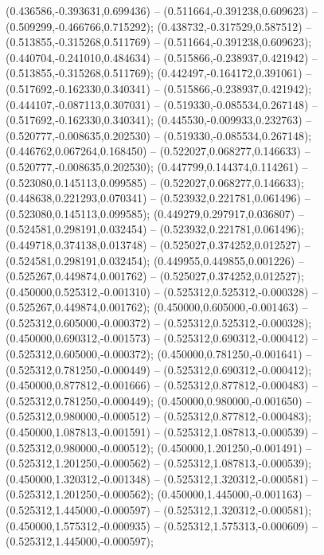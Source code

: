  (0.436586,-0.393631,0.699436) -- (0.511664,-0.391238,0.609623) -- (0.509299,-0.466766,0.715292);
 (0.438732,-0.317529,0.587512) -- (0.513855,-0.315268,0.511769) -- (0.511664,-0.391238,0.609623);
 (0.440704,-0.241010,0.484634) -- (0.515866,-0.238937,0.421942) -- (0.513855,-0.315268,0.511769);
 (0.442497,-0.164172,0.391061) -- (0.517692,-0.162330,0.340341) -- (0.515866,-0.238937,0.421942);
 (0.444107,-0.087113,0.307031) -- (0.519330,-0.085534,0.267148) -- (0.517692,-0.162330,0.340341);
 (0.445530,-0.009933,0.232763) -- (0.520777,-0.008635,0.202530) -- (0.519330,-0.085534,0.267148);
 (0.446762,0.067264,0.168450) -- (0.522027,0.068277,0.146633) -- (0.520777,-0.008635,0.202530);
 (0.447799,0.144374,0.114261) -- (0.523080,0.145113,0.099585) -- (0.522027,0.068277,0.146633);
 (0.448638,0.221293,0.070341) -- (0.523932,0.221781,0.061496) -- (0.523080,0.145113,0.099585);
 (0.449279,0.297917,0.036807) -- (0.524581,0.298191,0.032454) -- (0.523932,0.221781,0.061496);
 (0.449718,0.374138,0.013748) -- (0.525027,0.374252,0.012527) -- (0.524581,0.298191,0.032454);
 (0.449955,0.449855,0.001226) -- (0.525267,0.449874,0.001762) -- (0.525027,0.374252,0.012527);
 (0.450000,0.525312,-0.001310) -- (0.525312,0.525312,-0.000328) -- (0.525267,0.449874,0.001762);
 (0.450000,0.605000,-0.001463) -- (0.525312,0.605000,-0.000372) -- (0.525312,0.525312,-0.000328);
 (0.450000,0.690312,-0.001573) -- (0.525312,0.690312,-0.000412) -- (0.525312,0.605000,-0.000372);
 (0.450000,0.781250,-0.001641) -- (0.525312,0.781250,-0.000449) -- (0.525312,0.690312,-0.000412);
 (0.450000,0.877812,-0.001666) -- (0.525312,0.877812,-0.000483) -- (0.525312,0.781250,-0.000449);
 (0.450000,0.980000,-0.001650) -- (0.525312,0.980000,-0.000512) -- (0.525312,0.877812,-0.000483);
 (0.450000,1.087813,-0.001591) -- (0.525312,1.087813,-0.000539) -- (0.525312,0.980000,-0.000512);
 (0.450000,1.201250,-0.001491) -- (0.525312,1.201250,-0.000562) -- (0.525312,1.087813,-0.000539);
 (0.450000,1.320312,-0.001348) -- (0.525312,1.320312,-0.000581) -- (0.525312,1.201250,-0.000562);
 (0.450000,1.445000,-0.001163) -- (0.525312,1.445000,-0.000597) -- (0.525312,1.320312,-0.000581);
 (0.450000,1.575312,-0.000935) -- (0.525312,1.575313,-0.000609) -- (0.525312,1.445000,-0.000597);

